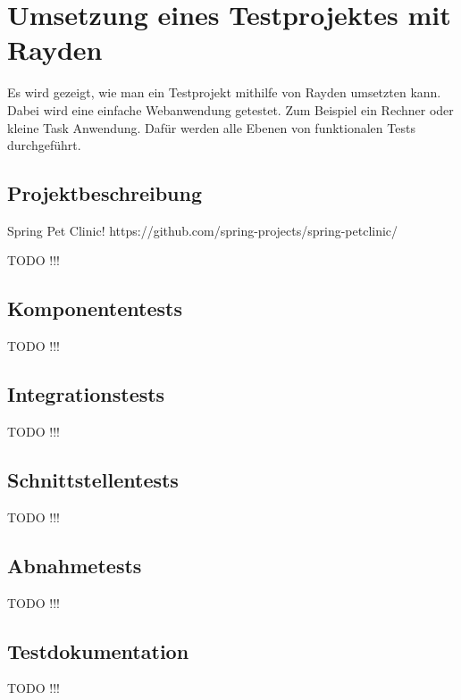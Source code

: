\chapter{Umsetzung eines Testprojektes mit Rayden}
\label{cha:Testen}

Es wird gezeigt, wie man ein Testprojekt mithilfe von Rayden umsetzten kann. Dabei wird eine einfache Webanwendung getestet. Zum Beispiel ein Rechner oder kleine Task Anwendung. Dafür werden alle Ebenen von funktionalen Tests durchgeführt.


\section{Projektbeschreibung}

Spring Pet Clinic!
https://github.com/spring-projects/spring-petclinic/

TODO !!!

\section{Komponententests}

TODO !!!

\section{Integrationstests}

TODO !!!

\section{Schnittstellentests}

TODO !!!

\section{Abnahmetests}

TODO !!!

\section{Testdokumentation}

TODO !!!
